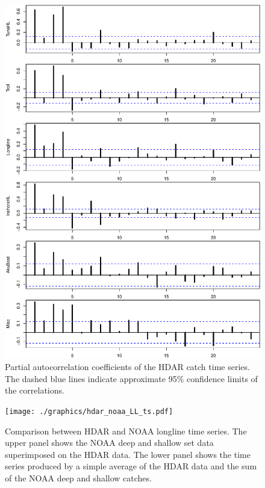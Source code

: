 \documentclass[12pt,letterpaper,twoside]{article}
\begin{document}
\begin{figure}
\begin{center}
\includegraphics[height=0.8\textheight]{./graphics/partial_acf.pdf}
\caption{\label{fig:catchPACF}
Partial autocorrelation coefficients of the HDAR catch time series. The
dashed blue lines indicate approximate 95\% confidence limits of the
correlations.}
\end{center}
\end{figure}

\begin{figure}
\begin{center}
\texttt{[image: ./graphics/hdar\_noaa\_LL\_ts.pdf]}
\caption{\label{fig:hdarnoaaLLTS}
Comparison between HDAR and NOAA longline time series. The upper panel
shows the NOAA deep and shallow set data superimposed on the HDAR
data. The lower panel shows the time series produced by a simple
average of the HDAR data and the sum of the NOAA deep and shallow
catches.}
\end{center}
\end{figure}
\end{document}
